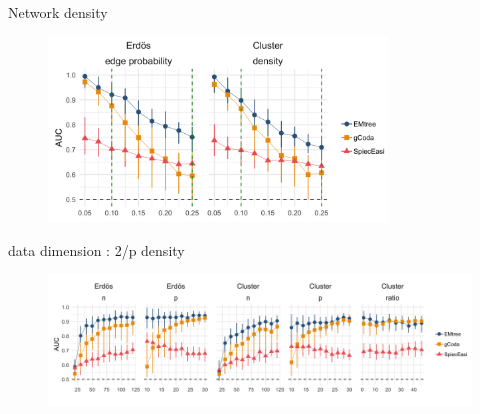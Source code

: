 \documentclass[11pt]{beamer}
\begin{document}
\begin{frame}{Network density}
    \begin{figure}
        \centering
        \includegraphics[width=9cm]{varyDens.png}
    \end{figure}
\end{frame}
\begin{frame}{data dimension : 2/p density}
    \begin{figure}
        \centering
       \hspace*{-0.5cm}%
        \includegraphics[width=\paperwidth]{auc2p}
    \end{figure}
\end{frame}
\end{document}

